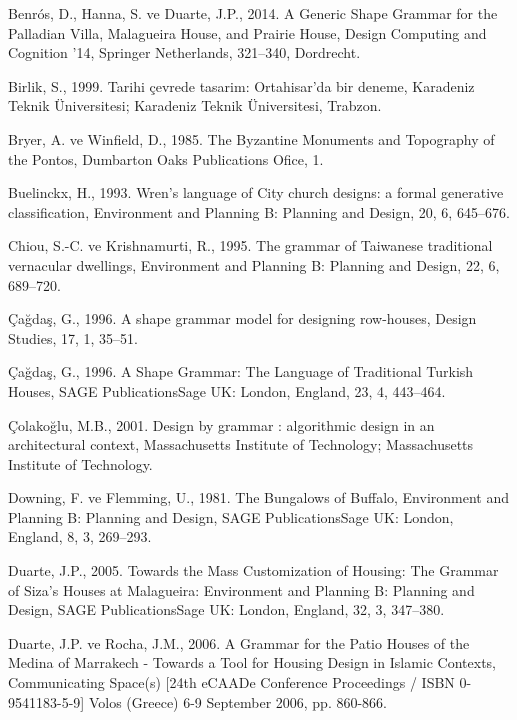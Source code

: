 \documentclass[12pt,turkish,a4paperpaper,]{report}
\begin{document}
\leavevmode\hypertarget{ref-Benros:2014bx}{}%
Benrós, D., Hanna, S. ve Duarte, J.P., 2014. A Generic Shape Grammar for
the Palladian Villa, Malagueira House, and Prairie House, Design
Computing and Cognition '14, Springer Netherlands, 321--340, Dordrecht.

\leavevmode\hypertarget{ref-Birlik:1999ux}{}%
Birlik, S., 1999. Tarihi çevrede tasarim: Ortahisar'da bir deneme,
Karadeniz Teknik Üniversitesi; Karadeniz Teknik Üniversitesi, Trabzon.

\leavevmode\hypertarget{ref-Bryer:2011ul}{}%
Bryer, A. ve Winfield, D., 1985. The Byzantine Monuments and Topography
of the Pontos, Dumbarton Oaks Publications Ofice, 1.

\leavevmode\hypertarget{ref-Buelinckx:1993io}{}%
Buelinckx, H., 1993. Wren's language of City church designs: a formal
generative classification, Environment and Planning B: Planning and
Design, 20, 6, 645--676.

\leavevmode\hypertarget{ref-Chiou:1995gj}{}%
Chiou, S.-C. ve Krishnamurti, R., 1995. The grammar of Taiwanese
traditional vernacular dwellings, Environment and Planning B: Planning
and Design, 22, 6, 689--720.

\leavevmode\hypertarget{ref-Cagdas:1996fe}{}%
Çağdaş, G., 1996. A shape grammar model for designing row-houses, Design
Studies, 17, 1, 35--51.

\leavevmode\hypertarget{ref-Cagdas:1996ft}{}%
Çağdaş, G., 1996. A Shape Grammar: The Language of Traditional Turkish
Houses, SAGE PublicationsSage UK: London, England, 23, 4, 443--464.

\leavevmode\hypertarget{ref-Colakoglu:2001wi}{}%
Çolakoğlu, M.B., 2001. Design by grammar : algorithmic design in an
architectural context, Massachusetts Institute of Technology;
Massachusetts Institute of Technology.

\leavevmode\hypertarget{ref-Downing:1981dx}{}%
Downing, F. ve Flemming, U., 1981. The Bungalows of Buffalo, Environment
and Planning B: Planning and Design, SAGE PublicationsSage UK: London,
England, 8, 3, 269--293.

\leavevmode\hypertarget{ref-Duarte:2005gd}{}%
Duarte, J.P., 2005. Towards the Mass Customization of Housing: The
Grammar of Siza's Houses at Malagueira: Environment and Planning B:
Planning and Design, SAGE PublicationsSage UK: London, England, 32, 3,
347--380.

\leavevmode\hypertarget{ref-Duarte:2006wg}{}%
Duarte, J.P. ve Rocha, J.M., 2006. A Grammar for the Patio Houses of the
Medina of Marrakech - Towards a Tool for Housing Design in Islamic
Contexts, Communicating Space(s) {[}24th eCAADe Conference Proceedings /
ISBN 0-9541183-5-9{]} Volos (Greece) 6-9 September 2006, pp. 860-866.
\end{document}
